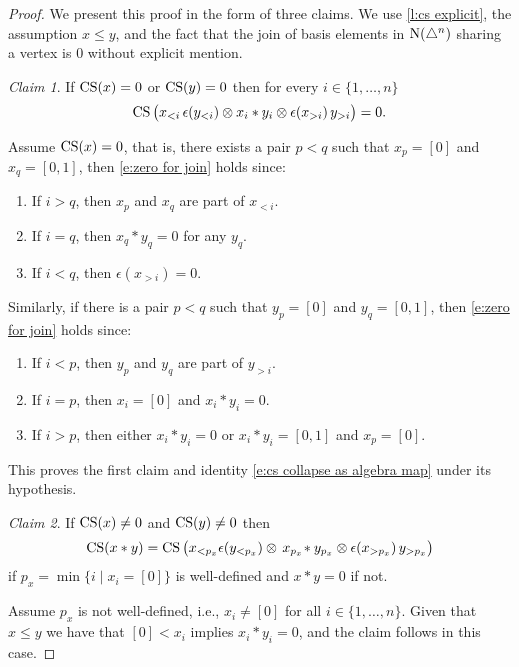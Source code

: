 \begin{proof}
	We present this proof in the form of three claims.
	We use \cref{l:cs explicit}, the assumption $x \leq y$, and the fact that the join of basis elements in $\operatorname{N}(\triangle^n)$ sharing a vertex is $0$ without explicit mention. \newline

	\noindent \textit{Claim 1}.
	If $\operatorname{CS}(x) = 0$ or $\operatorname{CS}(y) = 0$ then for every $i \in \{1, \dots, n\}$
	\begin{equation} \label{e:zero for join}
		\operatorname{CS} \big( x_{<i}\, \epsilon(y_{<i}) \otimes x_i \ast y_i \otimes \epsilon(x_{>i}) \, y_{>i} \big) = 0.
	\end{equation}

	Assume $\operatorname{CS}(x) = 0$, that is, there exists a pair $p < q$ such that $x_p = [0]$ and $x_q = [0,1]$, then \eqref{e:zero for join} holds since:
	\begin{enumerate}
		\item If $i > q$, then $x_p$ and $x_q$ are part of $x_{<i}$.
		\item If $i = q$, then $x_q \ast y_q = 0$ for any $y_q$.
		\item If $i < q$, then $\epsilon(x_{>i}) = 0$.
	\end{enumerate}
	Similarly, if there is a pair $p < q$ such that $y_p = [0]$ and $y_q = [0,1]$,  then \eqref{e:zero for join} holds since:
	\begin{enumerate}
		\item If $i < p$, then $y_p$ and $y_q$ are part of $y_{>i}$.
		\item If $i = p$, then $x_i = [0]$ and $x_i \ast y_i = 0$.
		\item If $i > p$, then either $x_i \ast y_i = 0$ or $x_i \ast y_i = [0,1]$ and $x_p = [0]$.
	\end{enumerate}
	This proves the first claim and identity \eqref{e:cs collapse as algebra map} under its hypothesis.

	\noindent \textit{Claim 2}.
	If $\operatorname{CS}(x) \neq 0$ and $\operatorname{CS}(y) \neq 0$ then
	\[
	\operatorname{CS}(x \ast y) =
	\operatorname{CS} \big( x_{<p_x} \epsilon(y_{<p_x}) \otimes \, x_{p_x} \! \ast y_{p_x} \otimes \epsilon(x_{>p_x}) \, y_{>p_x} \big)
	\]
	if $p_x = \min \big\{ i \mid x_i = [0] \big\}$ is well-defined and $x \ast y = 0$ if not.

	Assume $p_x$ is not well-defined, i.e., $x_i \neq [0]$ for all $i \in \{1, \dots, n\}$.
	Given that $x \leq y$ we have that $[0] < x_i$ implies $x_i \ast y_i = 0$, and the claim follows in this case.


\end{proof}
